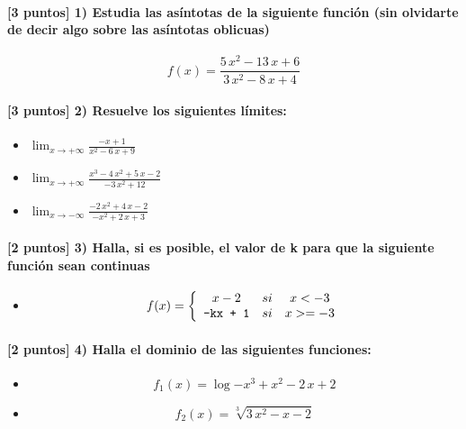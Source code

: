 \paragraph{[3 puntos] 1) Estudia las asíntotas de la siguiente función (sin olvidarte de decir algo sobre las asíntotas oblicuas)} \[f(x) = \frac{ 5 \, x^{2} - 13 \, x + 6 }{ 3 \, x^{2} - 8 \, x + 4 }\] \paragraph{[3 puntos] 2) Resuelve los siguientes límites:}\begin{itemize}\item $\displaystyle\lim_{x\to+\infty} \frac{ -x + 1 }{ x^{2} - 6 \, x + 9 }$ \item $\displaystyle\lim_{x\to+\infty} \frac{ x^{3} - 4 \, x^{2} + 5 \, x - 2 }{ -3 \, x^{2} + 12 }$ \item $\displaystyle\lim_{x\to-\infty} \frac{ -2 \, x^{2} + 4 \, x - 2 }{ -x^{2} + 2 \, x + 3 }$\end{itemize} \paragraph{[2 puntos] 3) Halla, si es posible, el valor de k para que la siguiente función sean continuas}\begin{itemize} \item\[ f(x)=\left\{\begin{array}{ccc} x - 2 & si & x<-3 \\ \text{\texttt{{-}kx{ }+{ }1}} & si & x>=-3 \\ \end{array}\right. \] \end{itemize} \paragraph{[2 puntos] 4) Halla el dominio de las siguientes funciones:}\begin{itemize} \item \[f_1(x) = \log{ -x^{3} + x^{2} - 2 \, x + 2 }\] \item \[f_2(x) = \sqrt[3]{ 3 \, x^{2} - x - 2 }\] \end{itemize}